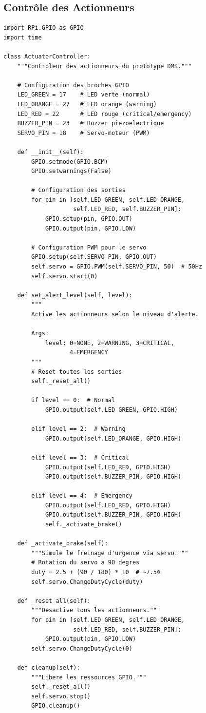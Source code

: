 \documentclass[12pt,a4paper,twoside]{report}
\begin{document}
\subsection{Contrôle des Actionneurs}

\begin{lstlisting}[style=pythonstyle, caption={Contrôle des actionneurs du robot.}, label={lst:actuators}]
import RPi.GPIO as GPIO
import time

class ActuatorController:
    """Controleur des actionneurs du prototype DMS."""
    
    # Configuration des broches GPIO
    LED_GREEN = 17    # LED verte (normal)
    LED_ORANGE = 27   # LED orange (warning)
    LED_RED = 22      # LED rouge (critical/emergency)
    BUZZER_PIN = 23   # Buzzer piezoelectrique
    SERVO_PIN = 18    # Servo-moteur (PWM)
    
    def __init__(self):
        GPIO.setmode(GPIO.BCM)
        GPIO.setwarnings(False)
        
        # Configuration des sorties
        for pin in [self.LED_GREEN, self.LED_ORANGE,
                    self.LED_RED, self.BUZZER_PIN]:
            GPIO.setup(pin, GPIO.OUT)
            GPIO.output(pin, GPIO.LOW)
        
        # Configuration PWM pour le servo
        GPIO.setup(self.SERVO_PIN, GPIO.OUT)
        self.servo = GPIO.PWM(self.SERVO_PIN, 50)  # 50Hz
        self.servo.start(0)
    
    def set_alert_level(self, level):
        """
        Active les actionneurs selon le niveau d'alerte.
        
        Args:
            level: 0=NONE, 2=WARNING, 3=CRITICAL, 
                   4=EMERGENCY
        """
        # Reset toutes les sorties
        self._reset_all()
        
        if level == 0:  # Normal
            GPIO.output(self.LED_GREEN, GPIO.HIGH)
        
        elif level == 2:  # Warning
            GPIO.output(self.LED_ORANGE, GPIO.HIGH)
        
        elif level == 3:  # Critical
            GPIO.output(self.LED_RED, GPIO.HIGH)
            GPIO.output(self.BUZZER_PIN, GPIO.HIGH)
        
        elif level == 4:  # Emergency
            GPIO.output(self.LED_RED, GPIO.HIGH)
            GPIO.output(self.BUZZER_PIN, GPIO.HIGH)
            self._activate_brake()
    
    def _activate_brake(self):
        """Simule le freinage d'urgence via servo."""
        # Rotation du servo a 90 degres
        duty = 2.5 + (90 / 180) * 10  # ~7.5%
        self.servo.ChangeDutyCycle(duty)
    
    def _reset_all(self):
        """Desactive tous les actionneurs."""
        for pin in [self.LED_GREEN, self.LED_ORANGE,
                    self.LED_RED, self.BUZZER_PIN]:
            GPIO.output(pin, GPIO.LOW)
        self.servo.ChangeDutyCycle(0)
    
    def cleanup(self):
        """Libere les ressources GPIO."""
        self._reset_all()
        self.servo.stop()
        GPIO.cleanup()
\end{lstlisting}
\end{document}
